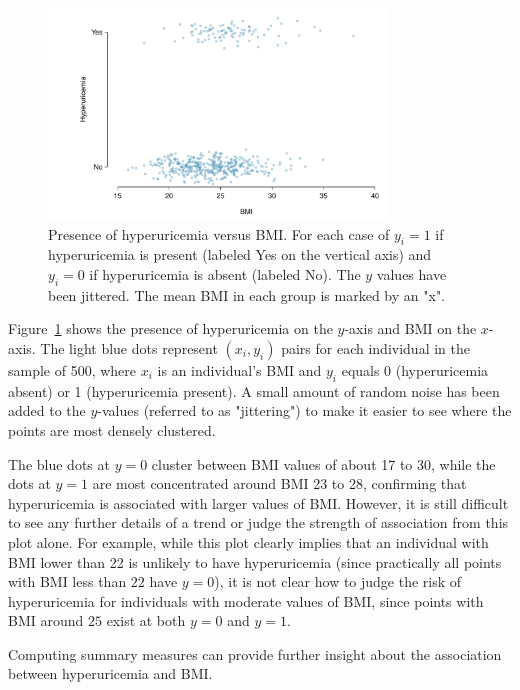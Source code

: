      \begin{figure}[h!]
        \centering
        \includegraphics[width=0.80\textwidth]
        {ch_logistic_regression_oi_biostat/figures/bmiHuProbSecondTile/bmiHuProbSecondTileDataOnly.pdf}
         \caption{Presence of hyperuricemia versus BMI. For each case of $y_i = 1$ if hyperuricemia is present (labeled Yes on the vertical axis) and $y_i = 0$ if hyperuricemia is absent (labeled No). The $y$ values have been jittered. The mean BMI in each group is marked by an "x".}
         \label{figure:bmiHuProbSecondTileDataOnly}
     \end{figure}

Figure~\ref{figure:bmiHuProbSecondTileDataOnly} shows the presence  of hyperuricemia on the $y$-axis and BMI on the $x$-axis. The light blue dots represent $(x_i, y_i)$ pairs for each individual in the sample of 500, where $x_i$ is an individual's BMI and $y_i$ equals 0 (hyperuricemia absent) or 1 (hyperuricemia present). A small amount of random noise has been added to the $y$-values (referred to as "jittering") to make it easier to see where the points are most densely clustered.

The blue dots at $y = 0$ cluster between BMI values of about 17 to 30, while the dots at $y = 1$ are most concentrated around BMI 23 to 28, confirming that  hyperuricemia is associated with larger values of BMI. However, it is still difficult to see any further details of a trend or judge the strength of association from this plot alone. For example, while this plot clearly implies that an individual with BMI lower than 22 is unlikely to have hyperuricemia (since practically all points with BMI less than $22$ have $y = 0$), it is not clear how to judge the risk of hyperuricemia for individuals with moderate values of BMI, since points with BMI around $25$ exist at both $y = 0$ and $y = 1$.

Computing summary measures can provide further insight about the association between hyperuricemia and BMI.

